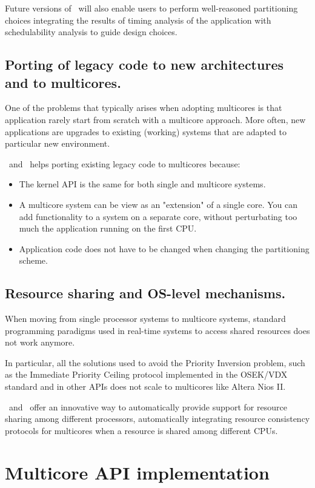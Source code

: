 Future versions of \rtd\ will also enable users to perform
well-reasoned partitioning choices integrating the results of timing
analysis of the application with schedulability analysis to guide
design choices.

\subsection{Porting of legacy code to new architectures and to
  multicores.}

One of the problems that typically arises when adopting
multicores is that application rarely start from scratch with a
multicore approach. More often, new applications are upgrades to
existing (working) systems that are adapted to particular new
environment.

\rtd\ and \ee\ helps porting existing legacy code to multicores
because:
\begin{itemize}
\item The kernel API is the same for both single and multicore
  systems.
\item A multicore system can be view as an "extension" of a single
  core. You can add functionality to a system on a separate core,
  without perturbating too much the application running on the
  first CPU.
\item Application code does not have to be changed when changing the
  partitioning scheme.
\end{itemize}

\subsection{Resource sharing and OS-level mechanisms.}
When moving from single processor systems to multicore systems,
standard programming paradigms used in real-time systems to access
shared resources does not work anymore.

In particular, all the solutions used to avoid the Priority Inversion
problem, such as the Immediate Priority Ceiling protocol implemented
in the OSEK/VDX standard and in other APIs does not scale to
multicores like Altera Nios II.

\rtd\ and \ee\ offer an innovative way to automatically provide support
for resource sharing among different processors, automatically
integrating resource consistency protocols for multicores when a
resource is shared among different CPUs.



\section{Multicore API implementation}

